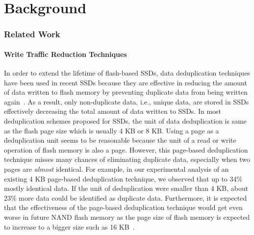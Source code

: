 
\chapter{Background} 
\label{chap:Background}


\subsection{Related Work}

\subsubsection{Write Traffic Reduction Techniques}
In order to extend the lifetime of flash-based SSDs,
data deduplication techniques have been used in recent SSDs
because they are effective in reducing the amount of data written to flash memory by preventing duplicate data from being written again~\cite{caftl,value-locality}.
As a result, only non-duplicate data, i.e., unique data, are stored in SSDs effectively decreasing the total amount of data written to
SSDs.
In most deduplication schemes proposed for SSDs,
the unit of data deduplication is same as the flash page size which is usually 4 KB or 8 KB.
Using a page as a deduplication unit seems to be reasonable 
because the unit of a read or write operation of flash memory is also a page. 
However, this page-based deduplication technique misses many chances of eliminating duplicate data, especially
when two pages are \textit{almost} identical.
For example, in our experimental analysis of an existing 4 KB page-based deduplication technique, we observed that
up to 34\% mostly identical data.
If the unit of deduplication were smaller than 4 KB, about 23\% more data could be identified as duplicate data.
Furthermore, it is expected that the effectiveness of the page-based deduplication technique would 
get even worse in future NAND flash memory as the page size of 
flash memory is expected to increase
to a bigger size such as 16 KB~\cite{16kpage}.


